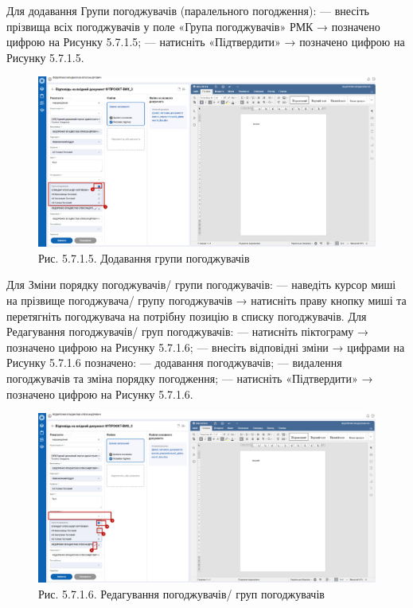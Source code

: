 Для додавання Групи погоджувачів (паралельного погодження):
--- внесіть прізвища всіх погоджувачів у поле «Група погоджувачів» РМК → позначено цифрою  на Рисунку 5.7.1.5;
--- натисніть «Підтвердити» → позначено цифрою  на Рисунку 5.7.1.5.

\begin{figure}[!htbp]
\centerline{\includegraphics[width=\textwidth]{img/5.7.1.5.png}}
\caption{Рис. 5.7.1.5. Додавання групи погоджувачів}
\end{figure}

Для Зміни порядку погоджувачів/ групи погоджувачів:
--- наведіть курсор миші на прізвище погоджувача/ групу погоджувачів →
натисніть праву кнопку миші та перетягніть погоджувача на потрібну
позицію в списку погоджувачів.
Для Редагування погоджувачів/ груп погоджувачів:
--- натисніть піктограму → позначено цифрою  на Рисунку 5.7.1.6;
--- внесіть відповідні зміни → цифрами на Рисунку 5.7.1.6 позначено:
 --- додавання погоджувачів;
 --- видалення погоджувачів та зміна порядку погодження;
--- натисніть «Підтвердити» → позначено цифрою  на Рисунку 5.7.1.6. 

\begin{figure}[!htbp]
\centerline{\includegraphics[width=\textwidth]{img/5.7.1.6.png}}
\caption{Рис. 5.7.1.6. Редагування погоджувачів/ груп погоджувачів}
\end{figure}

